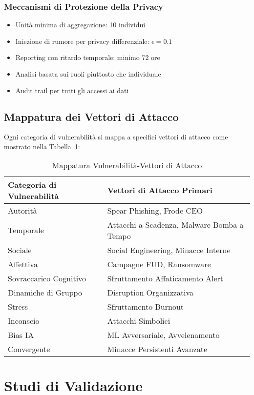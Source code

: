 \documentclass[11pt,a4paper]{article}
\begin{document}
\subsubsection{Meccanismi di Protezione della Privacy}
\begin{itemize}
\item Unità minima di aggregazione: 10 individui
\item Iniezione di rumore per privacy differenziale: $\epsilon = 0.1$
\item Reporting con ritardo temporale: minimo 72 ore
\item Analisi basata sui ruoli piuttosto che individuale
\item Audit trail per tutti gli accessi ai dati
\end{itemize}

\subsection{Mappatura dei Vettori di Attacco}

Ogni categoria di vulnerabilità si mappa a specifici vettori di attacco come mostrato nella Tabella~\ref{tab:mapping}:

\begin{table}[ht!]
\centering
\caption{Mappatura Vulnerabilità-Vettori di Attacco}
\label{tab:mapping}
\begin{tabular}{ll}
\toprule
Categoria di Vulnerabilità & Vettori di Attacco Primari \\
\midrule
Autorità & Spear Phishing, Frode CEO \\
Temporale & Attacchi a Scadenza, Malware Bomba a Tempo \\
Sociale & Social Engineering, Minacce Interne \\
Affettiva & Campagne FUD, Ransomware \\
Sovraccarico Cognitivo & Sfruttamento Affaticamento Alert \\
Dinamiche di Gruppo & Disruption Organizzativa \\
Stress & Sfruttamento Burnout \\
Inconscio & Attacchi Simbolici \\
Bias IA & ML Avversariale, Avvelenamento \\
Convergente & Minacce Persistenti Avanzate \\
\bottomrule
\end{tabular}
\end{table}

\section{Studi di Validazione}
\end{document}
